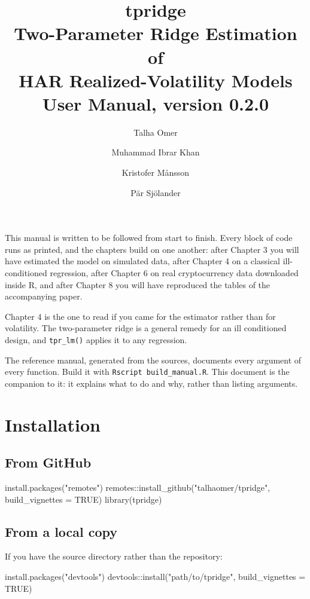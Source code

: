\documentclass[11pt,a4paper]{report}
\title{\vspace{-1.5cm}\textbf{\Huge tpridge}\\[6pt]
{\large Two-Parameter Ridge Estimation of\\HAR Realized-Volatility Models}\\[14pt]
{\normalsize User Manual, version 0.2.0}}
\author{Talha Omer \and Muhammad Ibrar Khan \and Kristofer M\aa nsson \and
P\"ar Sj\"olander}
\date{}
\begin{document}
\maketitle
\thispagestyle{empty}
\vfill
\noindent\small
This manual is written to be followed from start to finish. Every block
of code runs as printed, and the chapters build on one another: after
Chapter 3 you will have estimated the model on simulated data, after
Chapter 4 on a classical ill-conditioned regression, after Chapter 6 on
real cryptocurrency data downloaded inside R, and after Chapter 8 you
will have reproduced the tables of the accompanying paper.

\medskip
\noindent
Chapter 4 is the one to read if you came for the estimator rather than
for volatility. The two-parameter ridge is a general remedy for an ill
conditioned design, and \texttt{tpr\_lm()} applies it to any
regression.

\medskip
\noindent
The reference manual, generated from the sources, documents every
argument of every function. Build it with
\texttt{Rscript build\_manual.R}. This document is the companion to it:
it explains what to do and why, rather than listing arguments.
\newpage

\tableofcontents
\newpage

\chapter{Installation}

\section{From GitHub}

\begin{Rblock}
install.packages("remotes")
remotes::install_github("talhaomer/tpridge", build_vignettes = TRUE)
library(tpridge)
\end{Rblock}

\section{From a local copy}

If you have the source directory rather than the repository:

\begin{Rblock}
install.packages("devtools")
devtools::install("path/to/tpridge", build_vignettes = TRUE)
\end{Rblock}
\end{document}

